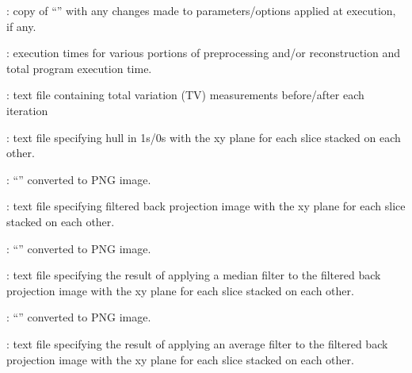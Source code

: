 \begin{tcbfunctionenv}
\begin{tcbparagraph}
\begin{deepList}[labelindent=1pt, leftmargin=*]
\begin{deepList}[labelindent=1pt, leftmargin=*]
\begin{deepList}[labelindent=1pt, leftmargin=*]
\begin{deepList}[labelindent=1pt, leftmargin=*]
\begin{deepList}[labelindent=1pt, leftmargin=*]
\begin{deepList}[labelindent=1pt, leftmargin=*]
\begin{deepList}[labelindent=1pt, leftmargin=*]
\begin{deepList}[labelindent=1pt, leftmargin=*]
\begin{deepList}[labelindent=1pt, leftmargin=*]
                                        \item {} : copy of ``'' with any changes made to parameters/options applied at execution, if any.
                                        \item {} : execution times for various portions of preprocessing and/or reconstruction and total program execution time.
                                        \item {} : text file containing total variation (TV) measurements before/after each iteration
                                        \item {} : text file specifying hull in 1s/0s with the xy plane for each slice stacked on each other.
                                        \item {} : ``'' converted to PNG image.
                                        \item {} : text file specifying filtered back projection image with the xy plane for each slice stacked on each other.
                                        \item {} : ``'' converted to PNG image.
                                        \item {} : text file specifying the result of applying a median filter to the filtered back projection image with the xy plane for each slice stacked on each other.
                                        \item {} : ``'' converted to PNG image.
                                        \item {} : text file specifying the result of applying an average filter to the filtered back projection image with the xy plane for each slice stacked on each other.

\end{deepList}
\end{deepList}
\end{deepList}
\end{deepList}
\end{deepList}
\end{deepList}
\end{deepList}
\end{deepList}
\end{deepList}
\end{tcbparagraph}
\end{tcbfunctionenv}
